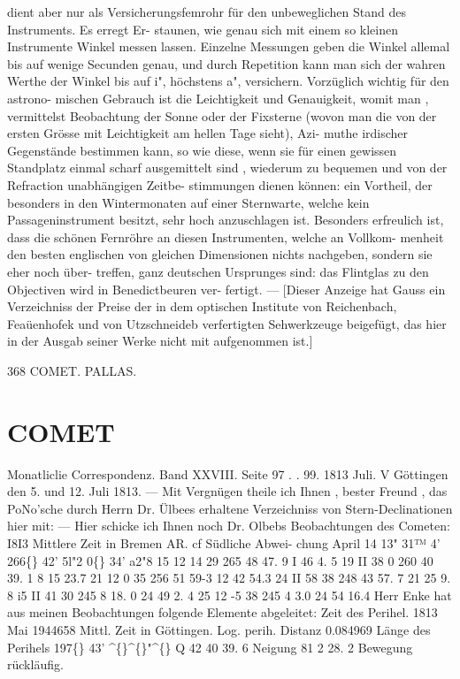 \documentclass[12pt,a4paper]{article}
\newcommand{\degree}{\textdegree}
\begin{document}
dient  aber  nur  als  Versicherungsfemrohr  für  den  unbeweglichen  Stand  des  Instruments.  Es  erregt  Er- 
staunen, wie  genau  sich  mit  einem  so  kleinen  Instrumente  Winkel  messen  lassen.  Einzelne  Messungen 
geben  die  Winkel  allemal  bis  auf  wenige  Secunden  genau,  und  durch  Repetition  kann  man  sich  der 
wahren  Werthe  der  Winkel  bis  auf  i",  höchstens  a",  versichern.  Vorzüglich  wichtig  für  den  astrono- 
mischen Gebrauch  ist  die  Leichtigkeit  und  Genauigkeit,  womit  man ,  vermittelst  Beobachtung  der  Sonne 
oder  der  Fixsterne  (wovon  man  die  von  der  ersten  Grösse  mit  Leichtigkeit  am  hellen  Tage  sieht),  Azi- 
muthe  irdischer  Gegenstände  bestimmen  kann,  so  wie  diese,  wenn  sie  für  einen  gewissen  Standplatz 
einmal  scharf  ausgemittelt  sind ,  wiederum  zu  bequemen  und  von  der  Refraction  unabhängigen  Zeitbe- 
stimmungen dienen  können:  ein  Vortheil,  der  besonders  in  den  Wintermonaten  auf  einer  Sternwarte, 
welche  kein  Passageninstrument  besitzt,  sehr  hoch  anzuschlagen  ist. 
Besonders  erfreulich  ist,  dass  die  schönen  Fernröhre  an  diesen  Instrumenten,  welche  an  Vollkom- 
menheit den  besten  englischen  von  gleichen  Dimensionen  nichts  nachgeben,  sondern  sie  eher  noch  über- 
treffen, ganz  deutschen  Ursprunges  sind:  das  Flintglas  zu  den  Objectiven  wird  in  Benedictbeuren  ver- 
fertigt. ---  [Dieser  Anzeige  hat  Gauss  ein  Verzeichniss  der  Preise  der  in  dem  optischen  Institute  von 
Reichenbach,  Feaüenhofek  und  von  Utzschneideb  verfertigten  Sehwerkzeuge  beigefügt,  das  hier  in  der 
Ausgab  seiner  Werke  nicht  mit  aufgenommen  ist.] 


\newpage
368 
COMET.      PALLAS. 

\section*{COMET}
Monatliclie  Correspondenz.     Band  XXVIII.  Seite  97  . .  99.     1813  Juli. 
V 
Göttingen  den  5.  und  12.  Juli  1813. 
---   Mit  Vergnügen  theile  ich  Ihnen ,  bester  Freund ,  das  PoNo'sche  durch  Herrn  Dr.  Ülbees 
erhaltene  Verzeichniss  von  Stern-Declinationen  hier  mit:   --- 
Hier  schicke  ich  Ihnen  noch  Dr.  Olbebs  Beobachtungen  des  Cometen: 
I8I3 
Mittlere  Zeit 
in  Bremen 
AR.  cf 
Südliche  Abwei- 
chung 
April    14 
13"  31™    4' 
266\degree\{\}   42'    5l"2 
0\degree\{\}  34'    a2"8 
15 
12     14     29 
265     48     47. 9 
I     46      4. 5 
19 
II     38       0 
260     40     39. 1 
8     15     23.7 
21 
12      0     35 
256     51     59-3 
12     42     54.3 
24 
II     58     38 
248     43     57. 7 
21     25       9. 8 
i5 
II     41     30 
245       8     18. 0 
24     49       2. 4 
25 
12      -5     38 
245       4       3.0 
24     54     16.4 
Herr  Enke  hat  aus  meinen  Beobachtungen  folgende  Elemente  abgeleitet: 
Zeit  des  Perihel.  1813  Mai    1944658  Mittl.  Zeit  in  Göttingen. 
Log.  perih.  Distanz    0.084969 
Länge  des  Perihels    197\degree\{\}  43'   \textasciicircum\{\}\textasciicircum\{\}"\textasciicircum\{\} 
Q    42    40    39. 6 
Neigung    81      2    28. 2 
Bewegung  rückläufig. 
\end{document}
